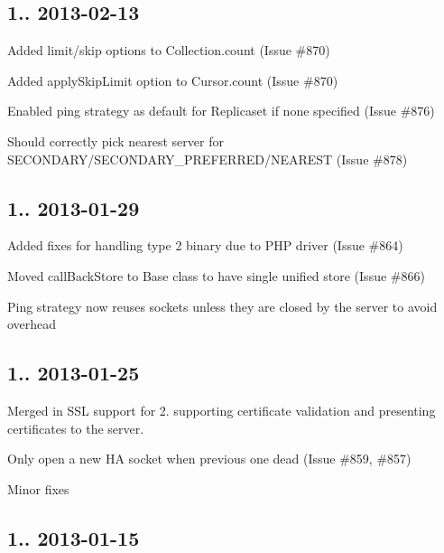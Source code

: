 \subsection*{1.. 2013-\/02-\/13 }


\begin{DoxyItemize}
\item Added limit/skip options to Collection.\+count (Issue \#870)
\item Added apply\+Skip\+Limit option to Cursor.\+count (Issue \#870)
\item Enabled ping strategy as default for Replicaset if none specified (Issue \#876)
\item Should correctly pick nearest server for S\+E\+C\+O\+N\+D\+A\+R\+Y/\+S\+E\+C\+O\+N\+D\+A\+R\+Y\+\_\+\+P\+R\+E\+F\+E\+R\+R\+E\+D/\+N\+E\+A\+R\+E\+ST (Issue \#878)
\end{DoxyItemize}

\subsection*{1.. 2013-\/01-\/29 }


\begin{DoxyItemize}
\item Added fixes for handling type 2 binary due to P\+HP driver (Issue \#864)
\item Moved call\+Back\+Store to Base class to have single unified store (Issue \#866)
\item Ping strategy now reuses sockets unless they are closed by the server to avoid overhead
\end{DoxyItemize}

\subsection*{1.. 2013-\/01-\/25 }


\begin{DoxyItemize}
\item Merged in S\+SL support for 2. supporting certificate validation and presenting certificates to the server.
\item Only open a new HA socket when previous one dead (Issue \#859, \#857)
\item Minor fixes
\end{DoxyItemize}

\subsection*{1.. 2013-\/01-\/15 }


